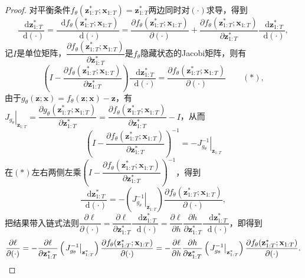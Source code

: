 \documentclass[cn,hazy,cyan,11pt,normal]{elegantnote}
\newcommand*{\dif}{\mathop{}\!\mathrm{d}}
\begin{document}
    \begin{proof}
        对平衡条件$f_{\theta}(\mathbf{z}_{1:T}^{*};\mathbf{x}_{1:T})=\mathbf{z}_{1:T}^{*}$两边同时对$(\cdot)$求导，得到\[\dfrac{\dif\mathbf{z}_{1:T}^{*}}{\dif(\cdot)}=\dfrac{\dif f_{\theta}(\mathbf{z}_{1:T}^{*};\mathbf{x}_{1:T})}{\dif (\cdot)}=\dfrac{\partial f_{\theta}(\mathbf{z}_{1:T}^{*};\mathbf{x}_{1:T})}{\partial(\cdot)}+\dfrac{\partial f_{\theta}(\mathbf{z}_{1:T}^{*};\mathbf{x}_{1:T})}{\partial\mathbf{z}_{1:T}^{*}}\dfrac{\dif\mathbf{z}_{1:T}^{*}}{\dif(\cdot)},\]记$I$是单位矩阵，$\dfrac{\partial f_{\theta}(\mathbf{z}_{1:T}^{*};\mathbf{x}_{1:T})}{\partial\mathbf{z}_{1:T}^{*}}$是$f_{\theta}$隐藏状态的Jacobi矩阵，则有\[\left(I-\dfrac{\partial f_{\theta}(\mathbf{z}_{1:T}^{*};\mathbf{x}_{1:T})}{\partial\mathbf{z}_{1:T}^{*}}\right)\dfrac{\dif\mathbf{z}_{1:T}^{*}}{\dif(\cdot)}=\dfrac{\partial f_{\theta}(\mathbf{z}_{1:T}^{*};\mathbf{x}_{1:T})}{\partial(\cdot)}\qquad(*),\]由于$g_{\theta}(\mathbf{z};\mathbf{x})=f_{\theta}(\mathbf{z};\mathbf{x})-\mathbf{z}$，有$\left.J_{g_{\theta}}\right|_{\mathbf{z}_{1:T}}=\dfrac{\partial g_{\theta}(\mathbf{z}_{1:T}^{*};\mathbf{x}_{1:T})}{\partial\mathbf{z}_{1:T}^{*}}=\dfrac{\partial f_{\theta}(\mathbf{z}_{1:T}^{*};\mathbf{x}_{1:T})}{\partial\mathbf{z}_{1:T}^{*}}-I$，从而\[\left(I-\dfrac{\partial f_{\theta}(\mathbf{z}_{1:T}^{*};\mathbf{x}_{1:T})}{\partial\mathbf{z}_{1:T}^{*}}\right)^{-1}=-\left.J_{g_{\theta}}^{-1}\right|_{\mathbf{z}_{1:T}}\]在$(*)$左右两侧左乘$\left(I-\dfrac{\partial f_{\theta}(\mathbf{z}_{1:T}^{*};\mathbf{x}_{1:T})}{\partial\mathbf{z}_{1:T}^{*}}\right)^{-1}$，得到\[\dfrac{\dif\mathbf{z}_{1:T}^{*}}{\dif(\cdot)}=-\left(\left.J_{g_{\theta}}^{-1}\right|_{\mathbf{z}_{1:T}}\right)\dfrac{\partial f_{\theta}(\mathbf{z}_{1:T}^{*};\mathbf{x}_{1:T})}{\partial(\cdot)},\]把结果带入链式法则$\dfrac{\partial\ell}{\partial(\cdot)}=\dfrac{\partial\ell}{\partial\mathbf{z}_{1:T}^{*}}\dfrac{\dif\mathbf{z}_{1:T}^{*}}{\dif(\cdot)}=\dfrac{\partial\ell}{\partial h}\dfrac{\partial h}{\partial\mathbf{z}_{1:T}^{*}}\dfrac{\dif\mathbf{z}_{1:T}^{*}}{\dif(\cdot)}$，即得到\[\dfrac{\partial\ell}{\partial(\cdot)}=-\dfrac{\partial\ell}{\partial\mathbf{z}_{1:T}^{*}}\left(\left. J_{g_{\theta}}^{-1}\right|_{\mathbf{z}_{1:T}^{*}} \right)\dfrac{\partial f_{\theta}(\mathbf{z}_{1:T}^{*};\mathbf{x}_{1:T})}{\partial(\cdot)}=-\dfrac{\partial\ell}{\partial h}\dfrac{\partial h}{\partial\mathbf{z}_{1:T}^{*}}\left(\left. J_{g_{\theta}}^{-1}\right|_{\mathbf{z}_{1:T}^{*}} \right)\dfrac{\partial f_{\theta}(\mathbf{z}_{1:T}^{*};\mathbf{x}_{1:T})}{\partial(\cdot)}. \qedhere\]
    \end{proof}
\end{document}
